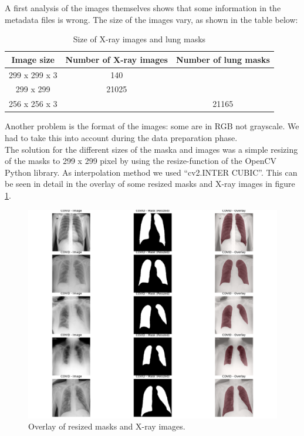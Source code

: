\documentclass{article}
\begin{document}
A first analysis of the images themselves shows that some information in the metadata files is wrong. The size of the images vary, as shown in the table below:
\begin{table}[h]
    \centering
    \begin{tabular}{|c|c|c|}
        \hline
        \textbf{Image size} & \textbf{Number of X-ray images} & \textbf{Number of lung masks} \\ \hline
        299 x 299 x 3 & 140 &  \\ \hline
        299 x 299 & 21025 &  \\ \hline \hline
        256 x 256 x 3 &  & 21165 \\ \hline
    \end{tabular}
    \caption{Size of X-ray images and lung masks}
    \label{tab:iamges_sizes}
\end{table}
Another problem is the format of the images: some are in RGB not grayscale. We had to take this into account during the data preparation phase.\\
The solution for the different sizes of the maska and images was a simple resizing of the masks to 299 x 299 pixel by using the resize-function of the OpenCV Python library. As interpolation method we used “cv2.INTER CUBIC”. This can be seen in detail in the overlay of some resized masks and X-ray images in figure \ref{fig:overlay_masks_images}.

\begin{figure}[h!]
    \centering
    \includegraphics[width=1\linewidth]{overlay_masks_images.png}
    \caption{Overlay of resized masks and X-ray images.}
    \label{fig:overlay_masks_images}
\end{figure}   
\end{document}
